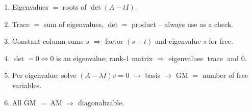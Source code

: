 \documentclass[a4paper,12pt]{article}
\begin{document}
\begin{merkbox}[title={Golden rules}]
\begin{enumerate}[leftmargin=*, nosep]
    \item Eigenvalues $=$ roots of $\det(A - tI)$.
    \item Trace $=$ sum of eigenvalues, $\det =$ product -- always use as a check.
    \item Constant column sums $s$ $\Rightarrow$ factor $(s-t)$ and eigenvalue $s$ for free.
    \item $\det = 0 \Leftrightarrow 0$ is an eigenvalue; rank-$1$ matrix $\Rightarrow$ eigenvalues $\operatorname{trace}$ and $0$.
    \item Per eigenvalue: solve $(A - \lambda I)v = 0$ $\to$ basis $\to$ GM $=$ number of free variables.
    \item All GM $=$ AM $\Rightarrow$ diagonalizable.
\end{enumerate}
\end{merkbox}
\end{document}
